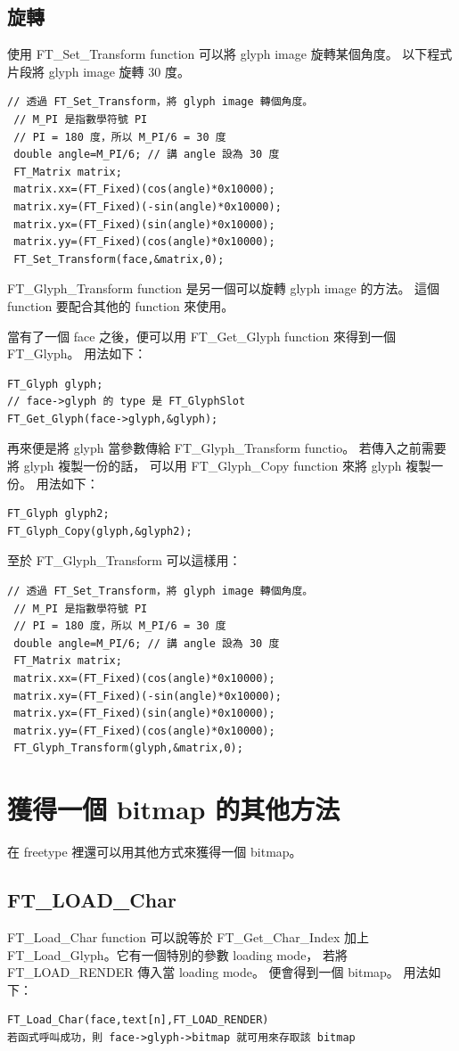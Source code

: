 \documentclass[12pt,a4]{article}
\begin{document}
\begin{CJK}{UTF8}{bsmi}
\subsection{\label{rotate}旋轉}
使用 FT\_{}Set\_{}Transform function 可以將 glyph image 旋轉某個角度。
以下程式片段將 glyph image 旋轉 30 度。
\begin{Verbatim}[commandchars=+!?]
 // 透過 FT_Set_Transform，將 glyph image 轉個角度。
 // M_PI 是指數學符號 PI
 // PI = 180 度，所以 M_PI/6 = 30 度
 double angle=M_PI/6; // 講 angle 設為 30 度
 FT_Matrix matrix;
 matrix.xx=(FT_Fixed)(cos(angle)*0x10000);
 matrix.xy=(FT_Fixed)(-sin(angle)*0x10000);
 matrix.yx=(FT_Fixed)(sin(angle)*0x10000);
 matrix.yy=(FT_Fixed)(cos(angle)*0x10000);
 FT_Set_Transform(face,&matrix,0);
\end{Verbatim}

FT\_{}Glyph\_{}Transform function 是另一個可以旋轉 glyph image 的方法。
這個 function 要配合其他的 function 來使用。

當有了一個 face 之後，便可以用 FT\_{}Get\_{}Glyph function 來得到一個 
FT\_{}Glyph。 用法如下：
\begin{Verbatim}[commandchars=+!?]
FT_Glyph glyph;
// face->glyph 的 type 是 FT_GlyphSlot
FT_Get_Glyph(face->glyph,&glyph);
\end{Verbatim}
再來便是將 glyph 當參數傳給 FT\_{}Glyph\_{}Transform functio。 若傳入之前需要將
glyph 複製一份的話， 可以用 FT\_{}Glyph\_Copy function 來將 glyph 複製一份。
用法如下：
\begin{Verbatim}[commandchars=+!?]
FT_Glyph glyph2;
FT_Glyph_Copy(glyph,&glyph2);
\end{Verbatim}
至於 FT\_{}Glyph\_{}Transform 可以這樣用：
\begin{Verbatim}[commandchars=+!?]
 // 透過 FT_Set_Transform，將 glyph image 轉個角度。
 // M_PI 是指數學符號 PI
 // PI = 180 度，所以 M_PI/6 = 30 度
 double angle=M_PI/6; // 講 angle 設為 30 度
 FT_Matrix matrix;
 matrix.xx=(FT_Fixed)(cos(angle)*0x10000);
 matrix.xy=(FT_Fixed)(-sin(angle)*0x10000);
 matrix.yx=(FT_Fixed)(sin(angle)*0x10000);
 matrix.yy=(FT_Fixed)(cos(angle)*0x10000);
 FT_Glyph_Transform(glyph,&matrix,0);
\end{Verbatim}
\newpage
\section{獲得一個 bitmap 的其他方法}
在 freetype 裡還可以用其他方式來獲得一個 bitmap。
\subsection{FT\_{}LOAD\_{}Char}
FT\_{}Load\_{}Char function 可以說等於 FT\_{}Get\_{}Char\_{}Index 加上 
FT\_{}Load\_{}Glyph。它有一個特別的參數 loading mode，
若將 FT\_{}LOAD\_{}RENDER 傳入當 loading mode。 便會得到一個 bitmap。 用法如下：
\begin{Verbatim}[commandchars=+!?]
FT_Load_Char(face,text[n],FT_LOAD_RENDER)
若函式呼叫成功，則 face->glyph->bitmap 就可用來存取該 bitmap
\end{Verbatim}

\end{CJK}
\end{document}
